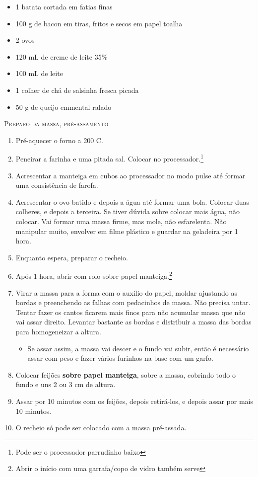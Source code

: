 {	\begin{itemize}
		\item 1 batata cortada em fatias finas
		\item 100 g de bacon em tiras, fritos e secos em papel toalha
		\item 2 ovos
		\item 120 mL de creme de leite 35\%
		\item 100 mL de leite
		\item 1 colher de chá de salsinha fresca picada
		\item 50 g de queijo emmental ralado
	\end{itemize}
}{

	\textsc{Preparo da massa, pré-assamento}

	\begin{enumerate}
		\item Pré-aquecer o forno a 200\grau{} C.
		\item Peneirar a farinha e uma pitada sal. Colocar no
		      processador.\footnote{Pode ser o processador parrudinho baixo}
		\item Acrescentar a manteiga em cubos ao processador no modo pulse até formar
		      uma consistência de farofa.
		\item Acrescentar o ovo batido e depois a água até formar uma bola. Colocar
		      duas colheres, e depois a terceira. Se tiver dúvida sobre colocar mais
		      água, não colocar. Vai formar uma massa firme, mas mole, não esfarelenta. Não
		      manipular muito, envolver em filme plástico e guardar na geladeira por 1
		      hora.
		\item Enquanto espera, preparar o recheio.
		\item Após 1 hora, abrir com rolo sobre papel manteiga.\footnote{Abrir o
			      início com uma garrafa/copo de vidro também serve}
		\item Virar a massa para a forma com o auxílio do papel, moldar ajustando as
		      bordas e preenchendo as falhas com pedacinhos de massa. Não precisa
		      untar. Tentar fazer os cantos ficarem mais finos para não acumular
		      massa que não vai assar direito. Levantar bastante as bordas e
		      distribuir a massa das bordas para homogeneizar a altura.
		      \begin{itemize}
			      \item Se assar assim, a massa vai descer e o fundo vai subir, então é
			            necessário assar com peso e fazer vários furinhos na base com
			            um garfo.
		      \end{itemize}
		\item Colocar feijões \textbf{sobre papel manteiga}, sobre a massa, cobrindo todo o
		      fundo e uns 2 ou 3 cm de altura.
		\item Assar por 10 minutos com os feijões, depois retirá-los, e depois assar
		      por mais 10 minutos.
		\item O recheio só pode ser colocado com a massa pré-assada.
	\end{enumerate}

}
